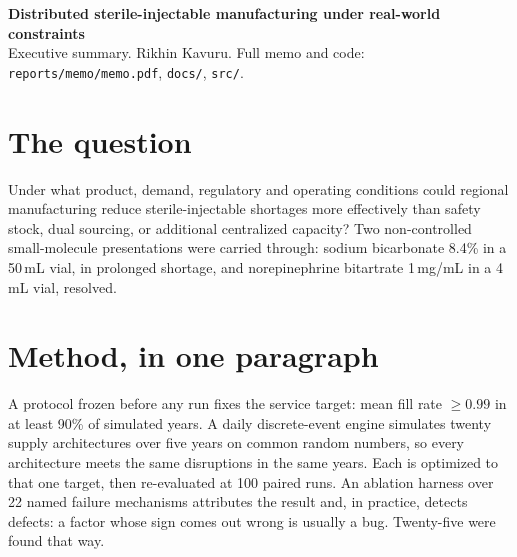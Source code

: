 \documentclass[10pt,letterpaper]{article}
\begin{document}
{\large\bfseries Distributed sterile-injectable manufacturing under real-world constraints}\\[0.3ex]
{\small Executive summary. Rikhin Kavuru. Full memo and code:
\texttt{reports/memo/memo.pdf}, \texttt{docs/}, \texttt{src/}.}

\vspace{0.6ex}

\section{The question}
Under what product, demand, regulatory and operating conditions could regional manufacturing
reduce sterile-injectable shortages more effectively than safety stock, dual sourcing, or
additional centralized capacity? Two non-controlled small-molecule presentations were carried
through: sodium bicarbonate 8.4\% in a 50\,mL vial, in prolonged shortage, and norepinephrine
bitartrate 1\,mg/mL in a 4\,mL vial, resolved.

\section{Method, in one paragraph}
A protocol frozen before any run fixes the service target: mean fill rate $\geq 0.99$ in at least
90\% of simulated years. A daily discrete-event engine simulates twenty supply architectures over
five years on common random numbers, so every architecture meets the same disruptions in the same
years. Each is optimized to that one target, then re-evaluated at 100 paired runs. An ablation
harness over 22 named failure mechanisms attributes the result and, in practice, detects defects:
a factor whose sign comes out wrong is usually a bug. Twenty-five were found that way.
\end{document}

